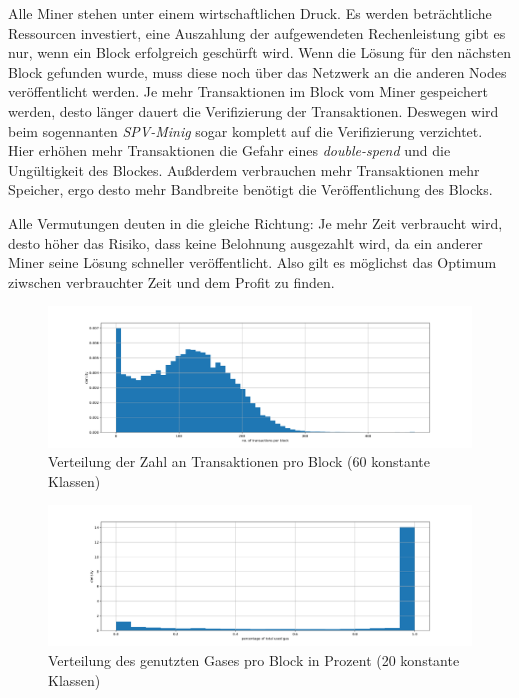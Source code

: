 \documentclass[runningheads]{llncs}
\begin{document}
Alle Miner stehen unter einem wirtschaftlichen Druck. Es werden beträchtliche Ressourcen investiert, eine Auszahlung der aufgewendeten Rechenleistung gibt es nur, wenn ein Block erfolgreich geschürft wird. Wenn die Lösung für den nächsten Block gefunden wurde, muss diese noch über das Netzwerk an die anderen Nodes veröffentlicht werden. Je mehr Transaktionen im Block vom Miner gespeichert werden, desto länger dauert die Verifizierung der Transaktionen. Deswegen wird beim sogennanten \textit{SPV-Minig} sogar komplett auf die Verifizierung verzichtet. \cite{svanevik_why_2018} Hier erhöhen mehr Transaktionen die Gefahr eines \textit{double-spend} und die Ungültigkeit des Blockes. Außderdem verbrauchen mehr Transaktionen mehr Speicher, ergo desto mehr Bandbreite benötigt die Veröffentlichung des Blocks. \cite{research_empty_nodate}

Alle Vermutungen deuten in die gleiche Richtung: Je mehr Zeit verbraucht wird, desto höher das Risiko, dass keine Belohnung ausgezahlt wird, da ein anderer Miner seine Lösung schneller veröffentlicht. Also gilt es möglichst das Optimum ziwschen verbrauchter Zeit und dem Profit zu finden.

\begin{figure}[h!]
  \centerline{\includegraphics[width=\textwidth, keepaspectratio]{blocks_transactions_per_block.png}}
  \caption{Verteilung der Zahl an Transaktionen pro Block (60 konstante Klassen) \cite{neemann_appendix_nodate}}
  \label{blocks_transactions_per_block}
\end{figure}

\begin{figure}[h!]
  \centerline{\includegraphics[width=\textwidth, keepaspectratio]{blocks_unused_gas.png}}
  \caption{Verteilung des genutzten Gases pro Block in Prozent (20 konstante Klassen) \cite{neemann_appendix_nodate}}
  \label{blocks_transactions_per_block}
\end{figure}
\end{document}
